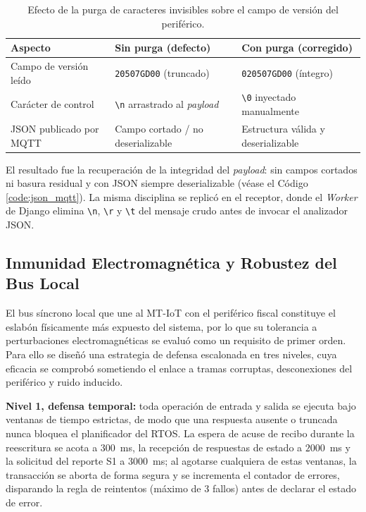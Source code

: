 \begin{table}[htbp]
\centering
\caption{Efecto de la purga de caracteres invisibles sobre el campo de versión del periférico.}
\label{tab:purga}
\begin{tabularx}{\textwidth}{@{}>{\raggedright\arraybackslash}p{4.0cm} >{\raggedright\arraybackslash}X >{\raggedright\arraybackslash}X@{}}
\toprule
\textbf{Aspecto} & \textbf{Sin purga (defecto)} & \textbf{Con purga (corregido)} \\
\midrule
Campo de versión leído & \texttt{20507GD00} (truncado) & \texttt{020507GD00} (íntegro) \\
Carácter de control & \texttt{\textbackslash n} arrastrado al \textit{payload} & \texttt{\textbackslash 0} inyectado manualmente \\
JSON publicado por MQTT & Campo cortado / no deserializable & Estructura válida y deserializable \\
\bottomrule
\end{tabularx}
\end{table}

\par El resultado fue la recuperación de la integridad del \textit{payload}: sin campos cortados ni basura residual y con JSON siempre deserializable (véase el Código \ref{code:json_mqtt}). La misma disciplina se replicó en el receptor, donde el \textit{Worker} de Django elimina \texttt{\textbackslash n}, \texttt{\textbackslash r} y \texttt{\textbackslash t} del mensaje crudo antes de invocar el analizador JSON.

\subsection{Inmunidad Electromagnética y Robustez del Bus Local}

\par El bus síncrono local que une al MT-IoT con el periférico fiscal constituye el eslabón físicamente más expuesto del sistema, por lo que su tolerancia a perturbaciones electromagnéticas se evaluó como un requisito de primer orden. Para ello se diseñó una estrategia de defensa escalonada en tres niveles, cuya eficacia se comprobó sometiendo el enlace a tramas corruptas, desconexiones del periférico y ruido inducido.\\

\par \textbf{Nivel 1, defensa temporal:} toda operación de entrada y salida se ejecuta bajo ventanas de tiempo estrictas, de modo que una respuesta ausente o truncada nunca bloquea el planificador del RTOS. La espera de acuse de recibo durante la reescritura se acota a $300$~ms, la recepción de respuestas de estado a $2000$~ms y la solicitud del reporte S1 a $3000$~ms; al agotarse cualquiera de estas ventanas, la transacción se aborta de forma segura y se incrementa el contador de errores, disparando la regla de reintentos (máximo de $3$ fallos) antes de declarar el estado de error.\\

